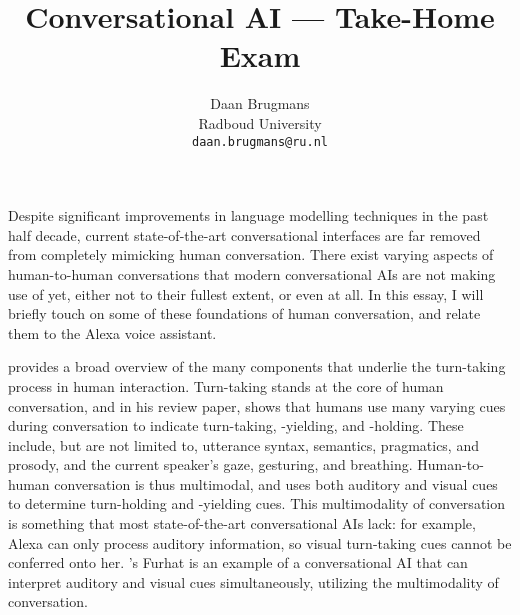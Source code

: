 \documentclass[11pt]{article}
\title{Conversational AI --- Take-Home Exam}
\author{Daan Brugmans \\
  Radboud University\\
  \texttt{daan.brugmans@ru.nl}
}
\begin{document}
\maketitle
        


Despite significant improvements in language modelling techniques in the past half decade, current state-of-the-art conversational interfaces are far removed from completely mimicking human conversation.
There exist varying aspects of human-to-human conversations that modern conversational AIs are not making use of yet, either not to their fullest extent, or even at all.
In this essay, I will briefly touch on some of these foundations of human conversation, and relate them to the Alexa voice assistant.

\citet{skantze2021turntaking} provides a broad overview of the many components that underlie the turn-taking process in human interaction.
Turn-taking stands at the core of human conversation, and in his review paper, \citeauthor{skantze2021turntaking} shows that humans use many varying cues during conversation to indicate turn-taking, -yielding, and -holding.
These include, but are not limited to, utterance syntax, semantics, pragmatics, and prosody, and the current speaker's gaze, gesturing, and breathing.
Human-to-human conversation is thus multimodal, and uses both auditory and visual cues to determine turn-holding and -yielding cues.
This multimodality of conversation is something that most state-of-the-art conversational AIs lack: for example, Alexa can only process auditory information, so visual turn-taking cues cannot be conferred onto her.
\citeauthor{skantze2021turntaking}'s Furhat is an example of a conversational AI that can interpret auditory and visual cues simultaneously, utilizing the multimodality of conversation.
\end{document}
